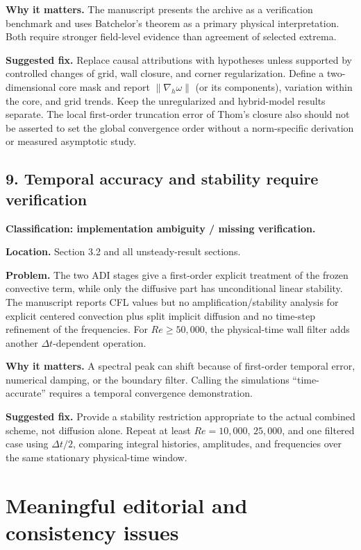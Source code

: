 \documentclass[11pt]{article}
\begin{document}
\textbf{Why it matters.} The manuscript presents the archive as a verification benchmark and uses Batchelor's theorem as a primary physical interpretation.  Both require stronger field-level evidence than agreement of selected extrema.

\textbf{Suggested fix.} Replace causal attributions with hypotheses unless supported by controlled changes of grid, wall closure, and corner regularization.  Define a two-dimensional core mask and report $\|\nabla_h\omega\|$ (or its components), variation within the core, and grid trends.  Keep the unregularized and hybrid-model results separate.  The local first-order truncation error of Thom's closure also should not be asserted to set the global convergence order without a norm-specific derivation or measured asymptotic study.

\subsection*{9. Temporal accuracy and stability require verification}

\textbf{Classification: implementation ambiguity / missing verification.}

\textbf{Location.} Section 3.2 and all unsteady-result sections.

\textbf{Problem.} The two ADI stages give a first-order explicit treatment of the frozen convective term, while only the diffusive part has unconditional linear stability.  The manuscript reports CFL values but no amplification/stability analysis for explicit centered convection plus split implicit diffusion and no time-step refinement of the frequencies.  For $Re\ge50{,}000$, the physical-time wall filter adds another $\Delta t$-dependent operation.

\textbf{Why it matters.} A spectral peak can shift because of first-order temporal error, numerical damping, or the boundary filter.  Calling the simulations ``time-accurate'' requires a temporal convergence demonstration.

\textbf{Suggested fix.} Provide a stability restriction appropriate to the actual combined scheme, not diffusion alone.  Repeat at least $Re=10{,}000$, $25{,}000$, and one filtered case using $\Delta t/2$, comparing integral histories, amplitudes, and frequencies over the same stationary physical-time window.

\section*{Meaningful editorial and consistency issues}
\end{document}
